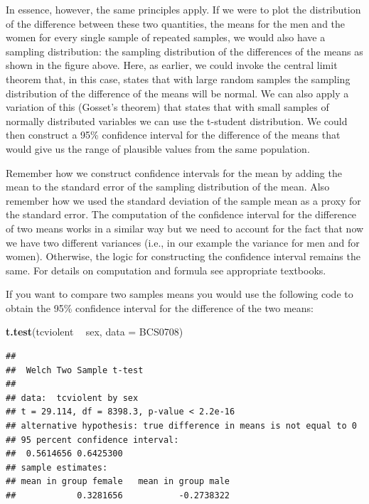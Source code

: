 \documentclass[]{book}
\newenvironment{Shaded}{\begin{snugshade}}{\end{snugshade}}
\newcommand{\DataTypeTok}[1]{\textcolor[rgb]{0.13,0.29,0.53}{#1}}
\newcommand{\KeywordTok}[1]{\textcolor[rgb]{0.13,0.29,0.53}{\textbf{#1}}}
\newcommand{\NormalTok}[1]{#1}
\newcommand{\OperatorTok}[1]{\textcolor[rgb]{0.81,0.36,0.00}{\textbf{#1}}}
\newcommand{\StringTok}[1]{\textcolor[rgb]{0.31,0.60,0.02}{#1}}
\theoremstyle{definition}
\theoremstyle{definition}
\theoremstyle{definition}
\theoremstyle{remark}
\begin{document}
In essence, however, the same principles apply. If we were to plot the
distribution of the difference between these two quantities, the means
for the men and the women for every single sample of repeated samples,
we would also have a sampling distribution: the sampling distribution of
the differences of the means as shown in the figure above. Here, as
earlier, we could invoke the central limit theorem that, in this case,
states that with large random samples the sampling distribution of the
difference of the means will be normal. We can also apply a variation of
this (Gosset's theorem) that states that with small samples of normally
distributed variables we can use the t-student distribution. We could
then construct a 95\% confidence interval for the difference of the
means that would give us the range of plausible values from the same
population.

Remember how we construct confidence intervals for the mean by adding
the mean to the standard error of the sampling distribution of the mean.
Also remember how we used the standard deviation of the sample mean as a
proxy for the standard error. The computation of the confidence interval
for the difference of two means works in a similar way but we need to
account for the fact that now we have two different variances (i.e., in
our example the variance for men and for women). Otherwise, the logic
for constructing the confidence interval remains the same. For details
on computation and formula see appropriate textbooks.

If you want to compare two samples means you would use the following
code to obtain the 95\% confidence interval for the difference of the
two means:

\begin{Shaded}
\begin{Highlighting}[]
\KeywordTok{t.test}\NormalTok{(tcviolent }\OperatorTok{~}\StringTok{ }\NormalTok{sex, }\DataTypeTok{data =}\NormalTok{ BCS0708)}
\end{Highlighting}
\end{Shaded}

\begin{verbatim}
## 
##  Welch Two Sample t-test
## 
## data:  tcviolent by sex
## t = 29.114, df = 8398.3, p-value < 2.2e-16
## alternative hypothesis: true difference in means is not equal to 0
## 95 percent confidence interval:
##  0.5614656 0.6425300
## sample estimates:
## mean in group female   mean in group male 
##            0.3281656           -0.2738322
\end{verbatim}
\end{document}
